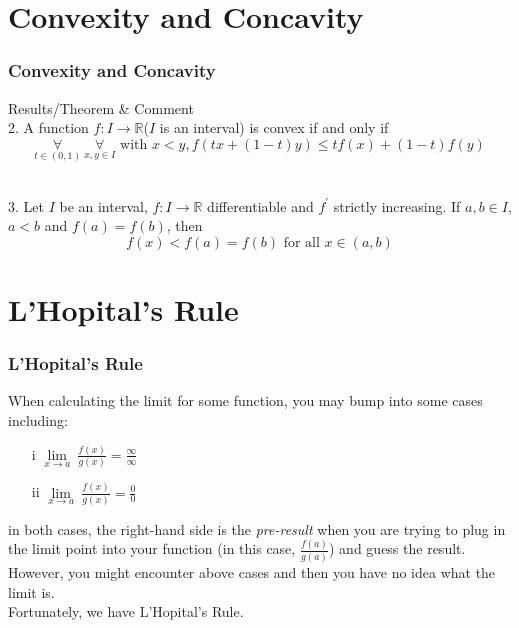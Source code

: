 \documentclass[12pt, t]{beamer}
\renewcommand{\emph}[1]{{\color{Turquoise3}\textsl{#1}}}
\begin{document}
\section{Convexity and Concavity}
\begin{frame}
    \frametitle{Convexity and Concavity}
    Results/Theorem \& Comment\\
    \vspace{1em}
    2. A function $f:I\rightarrow\mathbb{R}$($I$ is an interval) is convex if and only if
    \begin{equation*}
        \underset{t\in(0,1)}{\forall}\ \underset{x,y\in I}{\forall}\text{ with } x<y, f(tx+(1-t)y)\leq tf(x)+(1-t)f(y)
    \end{equation*}\\

    \vspace{2em}

    3. Let $I$ be an interval, $f:I\rightarrow\mathbb{R}$ differentiable and $f^\prime  $ strictly increasing. If $a, b\in I$, $a<b$ and
    $f(a)=f(b)$, then
    \begin{equation*}
        f(x)<f(a)=f(b)\text{ for all }x\in(a,b)
    \end{equation*}

\end{frame}

\section{L'Hopital's Rule}
\begin{frame}
    \frametitle{L'Hopital's Rule}
    When calculating the limit for some function, you may bump into some cases including:
    \begin{center}
        \begin{enumerate}
            \center \item[i] $\underset{x\rightarrow a}{\lim}\ \frac{f(x)}{g(x)} =\frac{\infty}{\infty}$
                \center \item[ii]$\underset{x\rightarrow a}{\lim}\ \frac{f(x)}{g(x)} = \frac{0}{0}$
        \end{enumerate}
    \end{center}

    \hspace{1em}
    in both cases, the right-hand side is the \emph{pre-result} when you are trying to plug in the limit point into your function
    (in this case, $\frac{f(a)}{g(a)}$)
    and guess the result. \\

    \hspace{1em}
    However, you might encounter above cases and then you have no idea what the limit is. \\
    \hspace{1em}
    Fortunately, we have L'Hopital's Rule.


\end{frame}
\end{document}
